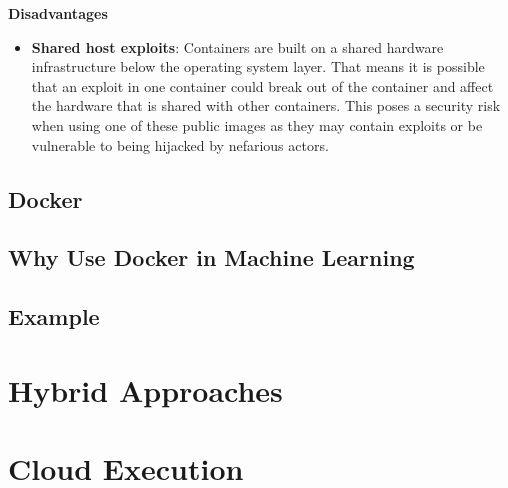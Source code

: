 \begin{enumerate}
          \textbf{Disadvantages}
          \begin{itemize}
              \item \textbf{Shared host exploits}: Containers are built on a shared hardware infrastructure below the operating system layer. That means it is possible that an exploit in one container could break out of the container and affect the hardware that is shared with other containers. This poses a security risk when using one of these public images as they may contain exploits or be vulnerable to being hijacked by nefarious actors.
          \end{itemize}
\end{enumerate}
\subsection{Docker}
\subsection{Why Use Docker in Machine Learning}
\subsection{Example}

\newpage

\section{Hybrid Approaches}

\section{Cloud Execution}